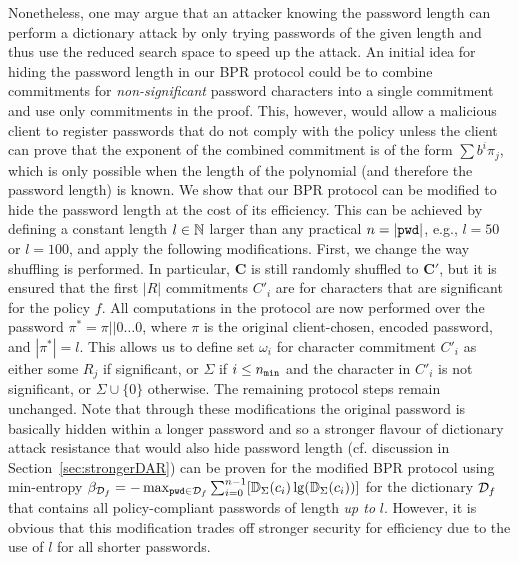 Nonetheless, one may argue that an attacker knowing the password length can perform a dictionary attack by only trying passwords of the given length and thus use the reduced search space to speed up the attack. An initial idea for hiding the password length in our \ac{BPR} protocol could be to combine commitments for \emph{non-significant} password characters into a single commitment and use only \pmin commitments in the proof. This, however, would allow a malicious client to register passwords that do not comply with the policy unless the client can prove that the exponent of the combined commitment is of the form $\sum b^i\pi_j$, which is only possible when the length of the polynomial (and therefore the password length) is known.
We show that our \ac{BPR} protocol can be modified to hide the password length at the cost of its efficiency. This can be achieved by defining a constant length $l\in\mathbb{N}$ larger than any practical $n=|\mathtt{pwd}|$, e.g., $l=50$ or $l=100$, and apply the following modifications. First, we change the way shuffling is performed.
In particular, $\bm C$ is still randomly shuffled to $\bm C'$, but it is ensured that the first $|R|$ commitments $C'_i$ are for characters that are significant for the policy $f$.
All computations in the protocol are now performed over the password $\pi^\ast=\pi||0\dots 0$, where $\pi$ is the original client-chosen, encoded password, and $|\pi^\ast|=l$.
This allows us to define set $\omega_i$ for character commitment $C'_i$ as either some $R_j$ if significant, or $\Sigma$ if $i\leq{n_\mathtt{min}}$ and the character in $C'_i$ is not significant, or $\Sigma \cup \{0\}$ otherwise. 
The remaining protocol steps remain unchanged.
Note that through these modifications the original password is basically hidden within a longer password and so a stronger flavour of dictionary attack resistance that would also hide password length (cf. discussion in Section~\ref{sec:strongerDAR}) can be proven for the modified \ac{BPR} protocol using min-entropy
$\beta_{\mathcal{D}_{f}} = -\max_{\mathtt{pwd}\in \mathcal{D}_{f}} \sum_{i=0}^{n-1} [\mathbb{D}_\Sigma(c_i)\lg(\mathbb{D}_\Sigma(c_i))]$
for the dictionary $\mathcal{D}_{f}$ that contains all policy-compliant passwords of length \emph{up to} $l$.
However, it is obvious that this modification trades off stronger security for efficiency due to the use of $l$ for all shorter passwords.


